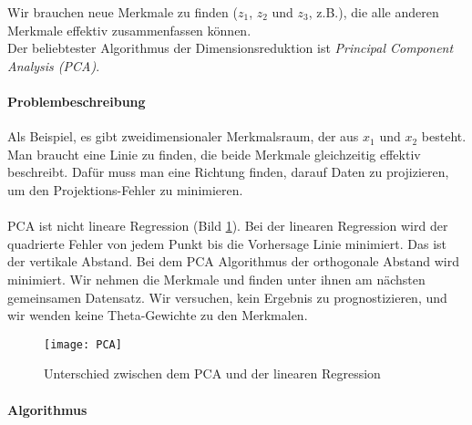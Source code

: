 Wir brauchen neue Merkmale zu finden ($z_{1}$, $z_{2}$ und $z_{3}$, z.B.), die alle anderen Merkmale effektiv zusammenfassen k\"onnen.\\
Der beliebtester Algorithmus der Dimensionsreduktion ist \textit{Principal Component Analysis (PCA)}.

\paragraph{Problembeschreibung\\}
Als Beispiel, es gibt zweidimensionaler Merkmalsraum, der aus $x_{1}$ und $x_{2}$ besteht. Man braucht eine Linie zu finden, die beide Merkmale gleichzeitig effektiv beschreibt. Daf\"ur muss man eine Richtung finden, darauf Daten zu projizieren, um den Projektions-Fehler zu minimieren.

\paragraph{}
PCA ist nicht lineare Regression (Bild \ref{fig:pcareg}). Bei der linearen Regression wird der quadrierte Fehler von jedem Punkt bis die Vorhersage Linie minimiert. Das ist der vertikale Abstand. Bei dem PCA Algorithmus der orthogonale Abstand wird minimiert. Wir nehmen die Merkmale und finden unter ihnen am n\"achsten gemeinsamen Datensatz. Wir versuchen, kein Ergebnis zu prognostizieren, und wir wenden keine Theta-Gewichte zu den Merkmalen.

\begin{figure}[ht]
\centering
\texttt{[image: PCA]}
\caption{Unterschied zwischen dem PCA und der linearen Regression}
\label{fig:pcareg}
\end{figure}

\paragraph{Algorithmus}

